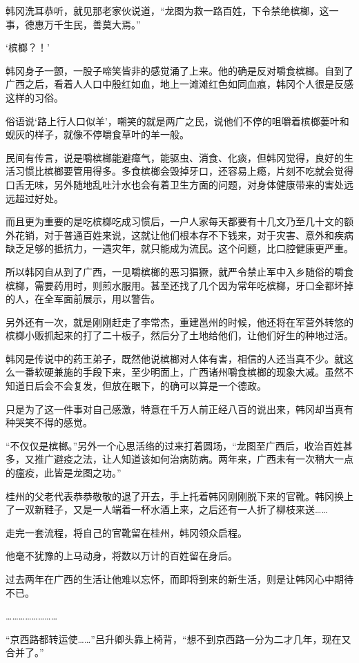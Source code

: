 韩冈洗耳恭听，就见那老家伙说道，“龙图为救一路百姓，下令禁绝槟榔，这一事，德惠万千生民，善莫大焉。”

‘槟榔？！’

韩冈身子一颤，一股子啼笑皆非的感觉涌了上来。他的确是反对嚼食槟榔。自到了广西之后，看着人人口中殷红如血，地上一滩滩红色如同血痕，韩冈个人很是反感这样的习俗。

俗语说‘路上行人口似羊’，嘲笑的就是两广之民，说他们不停的咀嚼着槟榔蒌叶和蚬灰的样子，就像不停嚼食草叶的羊一般。

民间有传言，说是嚼槟榔能避瘴气，能驱虫、消食、化痰，但韩冈觉得，良好的生活习惯比槟榔要管用得多。多食槟榔会毁掉牙口，还容易上瘾，片刻不吃就会觉得口舌无味，另外随地乱吐汁水也会有着卫生方面的问题，对身体健康带来的害处远远超过好处。

而且更为重要的是吃槟榔吃成习惯后，一户人家每天都要有十几文乃至几十文的额外花销，对于普通百姓来说，这就让他们根本存不下钱来，对于灾害、意外和疾病缺乏足够的抵抗力，一遇灾年，就只能成为流民。这个问题，比口腔健康更严重。

所以韩冈自从到了广西，一见嚼槟榔的恶习猖獗，就严令禁止军中入乡随俗的嚼食槟榔，需要药用时，则煎水服用。甚至还找了几个因为常年吃槟榔，牙口全都坏掉的人，在全军面前展示，用以警告。

另外还有一次，就是刚刚赶走了李常杰，重建邕州的时候，他还将在军营外转悠的槟榔小贩抓起来的打了二十板子，然后分了土地给他们，让他们好生的种地过活。

韩冈是传说中的药王弟子，既然他说槟榔对人体有害，相信的人还当真不少。就这么一番软硬兼施的手段下来，至少明面上，广西诸州嚼食槟榔的现象大减。虽然不知道日后会不会复发，但放在眼下，的确可以算是一个德政。

只是为了这一件事对自己感激，特意在千万人前正经八百的说出来，韩冈却当真有种哭笑不得的感觉。

“不仅仅是槟榔。”另外一个心思活络的过来打着圆场，“龙图至广西后，收治百姓甚多，又推广避疫之法，让人知道该如何治病防病。两年来，广西未有一次稍大一点的瘟疫，此皆是龙图之功。”

桂州的父老代表恭恭敬敬的退了开去，手上托着韩冈刚刚脱下来的官靴。韩冈换上了一双新鞋子，又是一人端着一杯水酒上来，之后还有一人折了柳枝来送……

走完一套流程，将自己的官靴留在桂州，韩冈领众启程。

他毫不犹豫的上马动身，将数以万计的百姓留在身后。

过去两年在广西的生活让他难以忘怀，而即将到来的新生活，则是让韩冈心中期待不已。

……………………

“京西路都转运使……”吕升卿头靠上椅背，“想不到京西路一分为二才几年，现在又合并了。”

